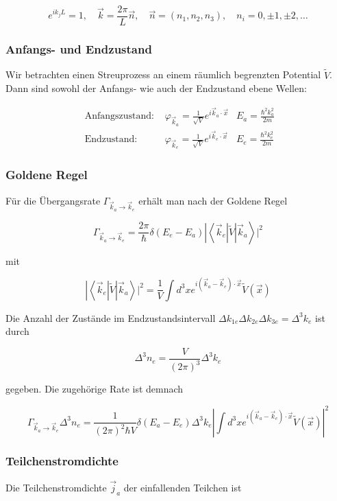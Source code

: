 \documentclass[10pt, letterpaper]{article}
\begin{document}
$$
e^{i k_{j} L}=1, \quad \vec{k}=\frac{2 \pi}{L} \vec{n}, \quad \vec{n}=\left(n_{1}, n_{2}, n_{3}\right), \quad n_{i}=0, \pm 1, \pm 2, \ldots
$$

\subsubsection*{Anfangs- und Endzustand}
Wir betrachten einen Streuprozess an einem räumlich begrenzten Potential $\tilde{V}$. Dann sind sowohl der Anfangs- wie auch der Endzustand ebene Wellen:

$$
\begin{array}{lll}
\text { Anfangszustand: } & \varphi_{\vec{k}_{a}}=\frac{1}{\sqrt{V}} e^{i \vec{k}_{a} \cdot \vec{x}} & E_{a}=\frac{\hbar^{2} k_{a}^{2}}{2 m} \\
\text { Endzustand: } & \varphi_{\vec{k}_{e}}=\frac{1}{\sqrt{V}} e^{i \vec{k}_{e} \cdot \vec{x}} & E_{e}=\frac{\hbar^{2} k_{e}^{2}}{2 m}
\end{array}
$$

\subsubsection*{Goldene Regel}
Für die Übergangsrate $\Gamma_{\vec{k}_{a} \rightarrow \vec{k}_{e}}$ erhält man nach der Goldene Regel

$$
\left.\Gamma_{\vec{k}_{a} \rightarrow \vec{k}_{e}}=\frac{2 \pi}{\hbar} \delta\left(E_{e}-E_{a}\right)\left|\left\langle\vec{k}_{e}\right| \tilde{V}\right| \vec{k}_{a}\right\rangle\left.\right|^{2}
$$

mit

$$
\left.\left|\left\langle\vec{k}_{e}\right| \tilde{V}\right| \vec{k}_{a}\right\rangle\left.\right|^{2}=\frac{1}{V} \int d^{3} x e^{i\left(\vec{k}_{a}-\vec{k}_{e}\right) \cdot \vec{x}} \tilde{V}(\vec{x})
$$

Die Anzahl der Zustände im Endzustandsintervall $\Delta k_{1 e} \Delta k_{2 e} \Delta k_{3 e}=\Delta^{3} k_{e}$ ist durch

$$
\Delta^{3} n_{e}=\frac{V}{(2 \pi)^{3}} \Delta^{3} k_{e}
$$

gegeben. Die zugehörige Rate ist demnach

$$
\Gamma_{\vec{k}_{a} \rightarrow \vec{k}_{e}} \Delta^{3} n_{e}=\frac{1}{(2 \pi)^{2} \hbar V} \delta\left(E_{a}-E_{e}\right) \Delta^{3} k_{e}\left|\int d^{3} x e^{i\left(\vec{k}_{a}-\vec{k}_{e}\right) \cdot \vec{x}} \tilde{V}(\vec{x})\right|^{2}
$$

\subsubsection*{Teilchenstromdichte}
Die Teilchenstromdichte $\vec{j}_{a}$ der einfallenden Teilchen ist
\end{document}
